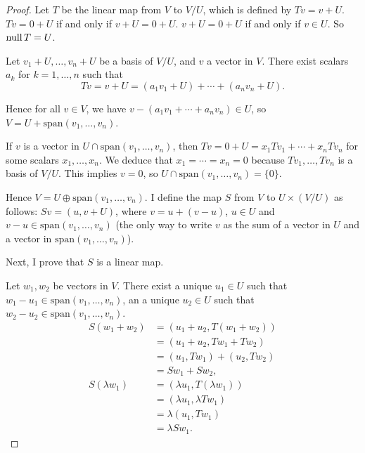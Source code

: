 \begin{proof}
    Let $T$ be the linear map from $V$ to $V/U$, which is defined by $Tv = v + U$. $Tv = 0 + U$ if and only if $v + U = 0 + U$. $v + U = 0 + U$ if and only if $v\in U$. So $\text{null}\,{T} = U$.

    Let $v_{1} + U, \ldots, v_{n} + U$ be a basis of $V/U$, and $v$ a vector in $V$. There exist scalars $a_{k}$ for $k = 1,\ldots, n$ such that
    \[
        Tv = v + U = (a_{1}v_{1} + U) + \cdots + (a_{n}v_{n} + U).
    \]

    Hence for all $v\in V$, we have $v - (a_{1}v_{1} + \cdots + a_{n}v_{n})\in U$, so $V = U + \text{span}(v_{1}, \ldots, v_{n})$.

    If $v$ is a vector in $U \cap \text{span}(v_{1}, \ldots, v_{n})$, then $Tv = 0 + U = x_{1}Tv_{1} + \cdots + x_{n}Tv_{n}$ for some scalars $x_{1}, \ldots, x_{n}$. We deduce that $x_{1} = \cdots = x_{n} = 0$ because $Tv_{1}, \ldots, Tv_{n}$ is a basis of $V/U$. This implies $v = 0$, so $U \cap \text{span}(v_{1}, \ldots, v_{n}) = \{0\}$.

    Hence $V = U \oplus \text{span}(v_{1}, \ldots, v_{n})$. I define the map $S$ from $V$ to $U\times (V/U)$ as follows: $Sv = (u, v + U)$, where $v = u + (v - u)$, $u\in U$ and $v - u\in \text{span}(v_{1}, \ldots, v_{n})$ (the only way to write $v$ as the sum of a vector in $U$ and a vector in $\text{span}(v_{1}, \ldots, v_{n})$).

    Next, I prove that $S$ is a linear map.

    Let $w_{1}, w_{2}$ be vectors in $V$. There exist a unique $u_{1}\in U$ such that $w_{1} - u_{1}\in \text{span}(v_{1}, \ldots, v_{n})$, an a unique $u_{2}\in U$ such that $w_{2} - u_{2}\in \text{span}(v_{1}, \ldots, v_{n})$.
    \begin{align*}
        S(w_{1} + w_{2}) & = (u_{1} + u_{2}, T(w_{1} + w_{2})) \\
                         & = (u_{1} + u_{2}, Tw_{1} + Tw_{2})  \\
                         & = (u_{1}, Tw_{1}) + (u_{2}, Tw_{2}) \\
                         & = Sw_{1} + Sw_{2},                  \\
        S(\lambda w_{1}) & = (\lambda u_{1}, T(\lambda w_{1})) \\
                         & = (\lambda u_{1}, \lambda Tw_{1})   \\
                         & = \lambda (u_{1}, Tw_{1})           \\
                         & = \lambda Sw_{1}.
    \end{align*}


\end{proof}
